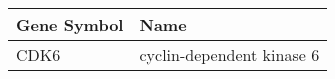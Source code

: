\begin{tabular}{ll}
\toprule
Gene Symbol &                      Name \\
\midrule
       CDK6 & cyclin-dependent kinase 6 \\
\bottomrule
\end{tabular}
